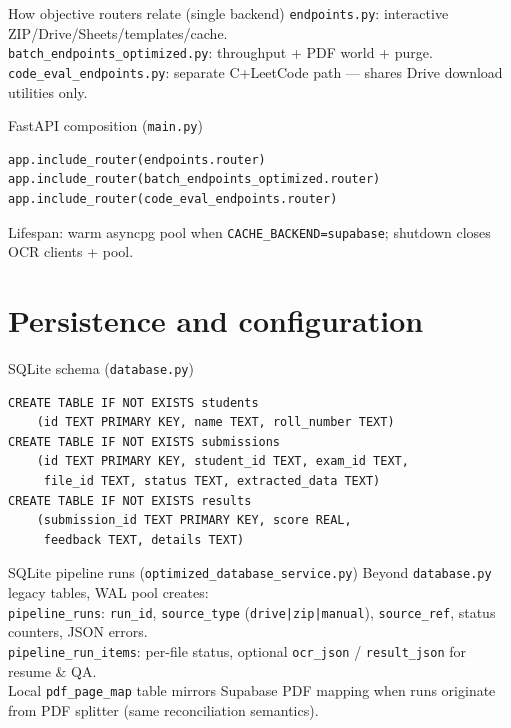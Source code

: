 \documentclass[aspectratio=169]{beamer}
\begin{document}
\begin{frame}{How objective routers relate (single backend)}
  \small
  \texttt{endpoints.py}: interactive ZIP/Drive/Sheets/templates/cache.\\
  \texttt{batch\_endpoints\_optimized.py}: throughput + PDF world + purge.\\
  \texttt{code\_eval\_endpoints.py}: separate C+LeetCode path --- shares Drive download utilities only.
\end{frame}

\begin{frame}[fragile]{FastAPI composition (\texttt{main.py})}
\begin{lstlisting}[style=pys]
app.include_router(endpoints.router)
app.include_router(batch_endpoints_optimized.router)
app.include_router(code_eval_endpoints.router)
\end{lstlisting}
\vfill
\tiny Lifespan: warm asyncpg pool when \texttt{CACHE\_BACKEND=supabase}; shutdown closes OCR clients + pool.
\end{frame}

\section{Persistence and configuration}

\begin{frame}[fragile]{SQLite schema (\texttt{database.py})}
\begin{lstlisting}[style=py]
CREATE TABLE IF NOT EXISTS students
    (id TEXT PRIMARY KEY, name TEXT, roll_number TEXT)
CREATE TABLE IF NOT EXISTS submissions
    (id TEXT PRIMARY KEY, student_id TEXT, exam_id TEXT,
     file_id TEXT, status TEXT, extracted_data TEXT)
CREATE TABLE IF NOT EXISTS results
    (submission_id TEXT PRIMARY KEY, score REAL,
     feedback TEXT, details TEXT)
\end{lstlisting}
\end{frame}

\begin{frame}[fragile]{SQLite pipeline runs (\texttt{optimized\_database\_service.py})}
  \tiny
  Beyond \texttt{database.py} legacy tables, WAL pool creates:\\[0.3em]
  \texttt{pipeline\_runs}: \texttt{run\_id}, \texttt{source\_type} (\texttt{drive|zip|manual}), \texttt{source\_ref}, status counters, JSON errors.\\
  \texttt{pipeline\_run\_items}: per-file status, optional \texttt{ocr\_json} / \texttt{result\_json} for resume \& QA.\\
  Local \texttt{pdf\_page\_map} table mirrors Supabase PDF mapping when runs originate from PDF splitter (same reconciliation semantics).
\end{frame}
\end{document}
